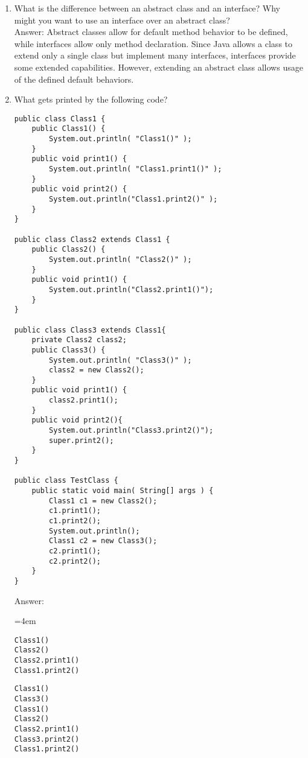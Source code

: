 \documentclass[11pt]{article}
\newenvironment{answer}{\large\lstset{basicstyle=\tiny\ttfamily}\color{white} \small{Answer:}}{}
\newenvironment{answer}{\large\lstset{basicstyle=\large\ttfamily}\color{red} \small{Answer:}}{}
\begin{document}
\begin{enumerate}
\begin{answer}
\begin{lstlisting}
// Square with side length of 1
shapes.add(new Square(1.0));

// Circle with radius of 9
shapes.add(new Circle(9.0));

// Triangle with base of 4 and height of 5
shapes.add(new Triangle(4.0, 5.0));

// Outputs the correct area of each shape
for( int i = 0; i < shapes.size(); i++ ){ 
   	double area = shapes.get(i).getArea();
   	System.out.println(area);
}
        \end{lstlisting}
\end{answer}


\item What is the difference between an abstract class and an interface? Why might you want to use an interface over an abstract class? \\
\begin{answer}
Abstract classes allow for default method behavior to be defined, while interfaces allow only method declaration.  Since Java allows a class to extend only a single class but implement many interfaces, interfaces provide some extended capabilities. However, extending an abstract class allows usage of the defined default behaviors. 
\end{answer}


\newpage
\item What gets printed by the following code?
\begin{lstlisting}
public class Class1 {
	public Class1() {
		System.out.println( "Class1()" );
	}
	public void print1() {
		System.out.println( "Class1.print1()" );
	}
	public void print2() {
		System.out.println("Class1.print2()" );
	}
}

public class Class2 extends Class1 {
	public Class2() {
		System.out.println( "Class2()" );
	}
	public void print1() {
		System.out.println("Class2.print1()");
	}
}

public class Class3 extends Class1{
	private Class2 class2;
	public Class3() {
		System.out.println( "Class3()" );
		class2 = new Class2();
	}
	public void print1() {
		class2.print1();
	}
	public void print2(){
		System.out.println("Class3.print2()");
		super.print2();
	}
}

public class TestClass {
	public static void main( String[] args ) {
		Class1 c1 = new Class2();
		c1.print1();
		c1.print2();
		System.out.println();
		Class1 c2 = new Class3();
		c2.print1();
		c2.print2();
	}
}
\end{lstlisting}
\begin{answer}
\begin{multicols}{2}
\hangindent=4em
    \begin{verbatim}
Class1()
Class2()
Class2.print1()
Class1.print2()
\end{verbatim}
\columnbreak
\begin{verbatim}
Class1()
Class3()
Class1()
Class2()
Class2.print1()
Class3.print2()
Class1.print2()
    \end{verbatim}
\end{multicols}
\end{answer}


\end{enumerate}
\end{document}
